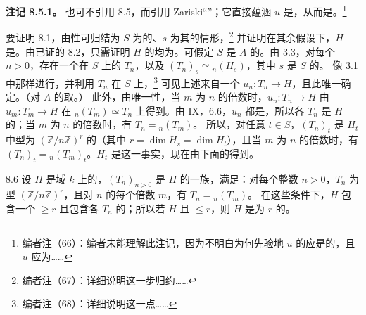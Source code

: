 \textbf{注记 8.5.1。} 也可不引用 8.5，而引用 Zariski“”；它直接蕴涵 $u$ 是，从而是。\footnote{编者注（66）：编者未能理解此注记，因为不明白为何先验地 $u$ 的应是的，且 $u$ 应为……}

要证明 8.1，由性可归结为 $S$ 为的、$s$ 为其的情形，\footnote{编者注（67）：详细说明这一步归约……} 并证明在其余假设下，$H$ 是。由已证的 8.2，只需证明 $H$ 的均为。可假定 $S$ 是 $A$ 的。由 3.3，对每个 $n>0$，存在一个在 $S$ 上的 $T_n$，以及 $(T_n)_s\simeq{}_n(H_s)$，其中 $s$ 是 $S$ 的。
像 3.1 中那样进行，并利用 $T_n$ 在 $S$ 上，\footnote{编者注（68）：详细说明这一点……} 可见上述来自一个 $u_n:T_n\to H$，且此唯一确定。（对 $A$ 的取。）
此外，由唯一性，当 $m$ 为 $n$ 的倍数时，$u_n:T_n\to H$ 由 $u_m:T_m\to H$ 在 ${}_n(T_m)\simeq T_n$ 上得到。由 IX，6.6，$u_n$ 都是，所以各 $T_n$ 是 $H$ 的；当 $m$ 为 $n$ 的倍数时，有 $T_n={}_n(T_m)$。
所以，对任意 $t\in S$，$(T_n)_t$ 是 $H_t$ 中型为 $(\mathbb Z/n\mathbb Z)^r$ 的（其中 $r=\dim H_s=\dim H_t$），且当 $m$ 为 $n$ 的倍数时，有 $(T_n)_t={}_n(T_m)_t$。$H_t$ 是这一事实，现在由下面的得到。
\begin{SGAresult}{}{8.6}
设 $H$ 是域 $k$ 上的，$(T_n)_{n>0}$ 是 $H$ 的一族，满足：对每个整数 $n>0$，$T_n$ 为型 $(\mathbb Z/n\mathbb Z)^r$，且对 $n$ 的每个倍数 $m$，有 $T_n={}_n(T_m)$。
在这些条件下，$H$ 包含一个 $\geq r$ 且包含各 $T_n$ 的；所以若 $H$ 且 $\leq r$，则 $H$ 是为 $r$ 的。
\end{SGAresult}
